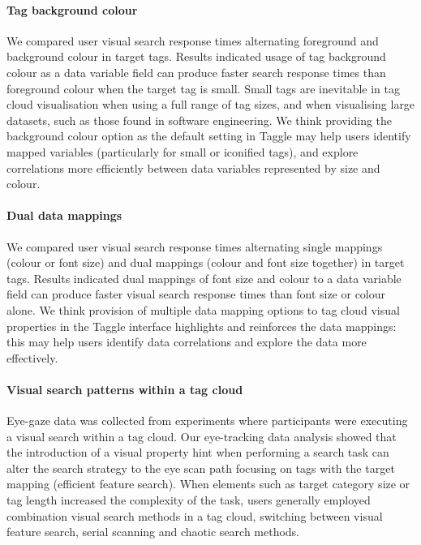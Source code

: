 
\paragraph{Tag background colour} We compared user visual search response times alternating foreground and background colour in target tags. Results indicated usage of tag background colour as a data variable field can produce faster search response times than foreground colour when the target tag is small. Small tags are inevitable in tag cloud visualisation when using a full range of tag sizes, and when visualising large datasets, such as those found in software engineering. We think providing the background colour option as the default setting in Taggle may help users identify mapped variables (particularly for small or iconified tags), and explore correlations more efficiently between data variables represented by size and colour. 

\paragraph{Dual data mappings} We compared user visual search response times alternating single mappings (colour or font size) and dual mappings (colour and font size together) in target tags. Results indicated dual mappings of font size and colour to a data variable field can produce faster visual search response times than font size or colour alone. We think provision of multiple data mapping options to tag cloud visual properties in the Taggle interface highlights and reinforces the data mappings: this may help users identify data correlations and explore the data more effectively.

\paragraph{Visual search patterns within a tag cloud} Eye-gaze data was collected from experiments where participants were executing a visual search within a tag cloud. Our eye-tracking data analysis showed that the introduction of a visual property hint when performing a search task can alter the search strategy to the eye scan path focusing on tags with the target mapping (efficient feature search). When elements such as target category size or tag length increased the complexity of the task, users generally employed combination visual search methods in a tag cloud, switching between visual feature search, serial scanning and chaotic search methods.

